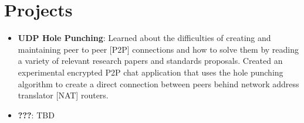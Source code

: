 \documentclass[letterpaper,11pt]{article}
\newcommand{\resumeItem}[2]{
  \item\small{
    \textbf{#1}{: #2 \vspace{-2pt}}
  }
}
\newcommand{\resumeSubItem}[2]{\resumeItem{#1}{#2}\vspace{-4pt}}
\newcommand{\resumeSubHeadingListStart}{\begin{itemize}[leftmargin=*]}
\newcommand{\resumeSubHeadingListEnd}{\end{itemize}}
\begin{document}
\section{Projects}
  \resumeSubHeadingListStart
    \resumeSubItem{UDP Hole Punching}
      {Learned about the difficulties of creating and maintaining peer to peer [P2P] connections and how to solve them by reading a variety of relevant research papers and standards proposals. Created an experimental encrypted P2P chat application that uses the hole punching algorithm to create a direct connection between peers behind network address translator [NAT] routers.}
    \resumeSubItem{???}
      {TBD}
  \resumeSubHeadingListEnd

%


\end{document}
